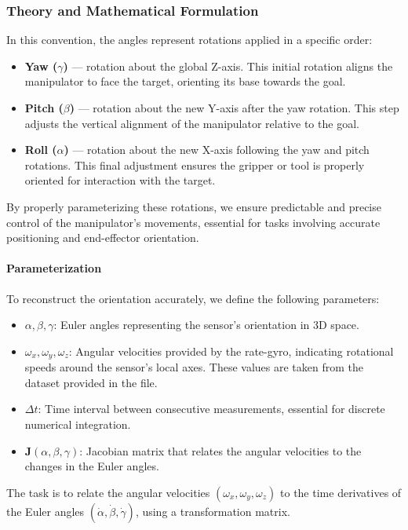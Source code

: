 \documentclass[12pt]{article}
\begin{document}
\subsubsection{Theory and Mathematical Formulation}

In this convention, the angles represent rotations applied in a specific order:
\begin{itemize}
    \item \textbf{Yaw (\(\gamma\))} — rotation about the global Z-axis. This initial rotation aligns the manipulator to face the target, orienting its base towards the goal.
    \item \textbf{Pitch (\(\beta\))} — rotation about the new Y-axis after the yaw rotation. This step adjusts the vertical alignment of the manipulator relative to the goal.
    \item \textbf{Roll (\(\alpha\))} — rotation about the new X-axis following the yaw and pitch rotations. This final adjustment ensures the gripper or tool is properly oriented for interaction with the target.
\end{itemize}

By properly parameterizing these rotations, we ensure predictable and precise control of the manipulator's movements, essential for tasks involving accurate positioning and end-effector orientation.

\paragraph{Parameterization}
To reconstruct the orientation accurately, we define the following parameters:
\begin{itemize}
    \item \(\alpha, \beta, \gamma\): Euler angles representing the sensor's orientation in 3D space.
    \item \(\omega_x, \omega_y, \omega_z\): Angular velocities provided by the rate-gyro, indicating rotational speeds around the sensor’s local axes. These values are taken from the dataset provided in the file.
    \item \(\Delta t\): Time interval between consecutive measurements, essential for discrete numerical integration.
    \item \(\mathbf{J}(\alpha, \beta, \gamma)\): Jacobian matrix that relates the angular velocities to the changes in the Euler angles.
\end{itemize}

The task is to relate the angular velocities \((\omega_x, \omega_y, \omega_z)\) to the time derivatives of the Euler angles \((\dot{\alpha}, \dot{\beta}, \dot{\gamma})\), using a transformation matrix.
\end{document}
